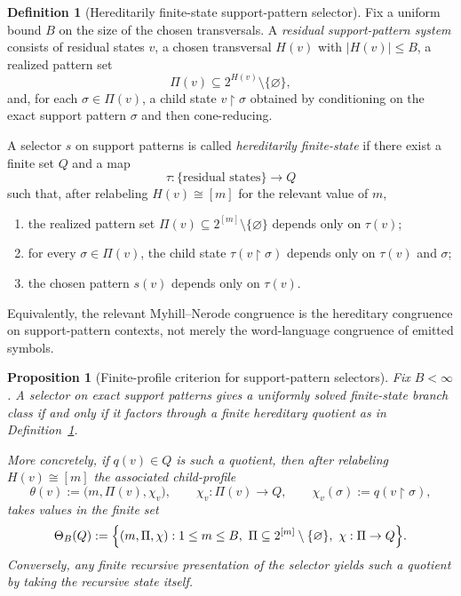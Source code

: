\documentclass[11pt]{article}
\newtheorem{proposition}[theorem]{Proposition}
\theoremstyle{definition}
\newtheorem{definition}[theorem]{Definition}
\newcommand{\1}{\mathbf{1}}
\begin{document}
\begin{definition}[Hereditarily finite-state support-pattern selector]\label{def:hereditary-pattern-selector}
Fix a uniform bound $B$ on the size of the chosen transversals.
A \emph{residual support-pattern system} consists of residual states $v$, a chosen transversal $H(v)$ with $|H(v)|\le B$, a realized pattern set
\[
\Pi(v)\subseteq 2^{H(v)}\setminus \{\varnothing\},
\]
and, for each $\sigma\in \Pi(v)$, a child state $v\!\restriction \sigma$ obtained by conditioning on the exact support pattern $\sigma$ and then cone-reducing.

A selector $s$ on support patterns is called \emph{hereditarily finite-state} if there exist a finite set $Q$ and a map
\[
\tau:\{\text{residual states}\}\to Q
\]
such that, after relabeling $H(v)\cong [m]$ for the relevant value of $m$,
\begin{enumerate}[label=(\roman*),leftmargin=2.2em]
\item the realized pattern set $\Pi(v)\subseteq 2^{[m]}\setminus\{\varnothing\}$ depends only on $\tau(v)$;
\item for every $\sigma\in \Pi(v)$, the child state $\tau(v\!\restriction \sigma)$ depends only on $\tau(v)$ and $\sigma$;
\item the chosen pattern $s(v)$ depends only on $\tau(v)$.
\end{enumerate}
Equivalently, the relevant Myhill--Nerode congruence is the hereditary congruence on support-pattern contexts, not merely the word-language congruence of emitted symbols.
\end{definition}

\begin{proposition}[Finite-profile criterion for support-pattern selectors]\label{prop:selector-finite-profile}
Fix $B<\infty$.
A selector on exact support patterns gives a uniformly solved finite-state branch class if and only if it factors through a finite hereditary quotient as in Definition~\ref{def:hereditary-pattern-selector}.

More concretely, if $q(v)\in Q$ is such a quotient, then after relabeling $H(v)\cong [m]$ the associated child-profile
\[
\theta(v):=\bigl(m,\Pi(v),\chi_v\bigr),
\qquad
\chi_v:\Pi(v)\to Q,
\qquad
\chi_v(\sigma):=q(v\!\restriction \sigma),
\]
takes values in the finite set
\[
\Theta_B(Q):=
\Bigl\{
(m,\Pi,\chi):
1\le m\le B,\ 
\Pi\subseteq 2^{[m]}\setminus\{\varnothing\},\ 
\chi:\Pi\to Q
\Bigr\}.
\]
Conversely, any finite recursive presentation of the selector yields such a quotient by taking the recursive state itself.
\end{proposition}
\end{document}
